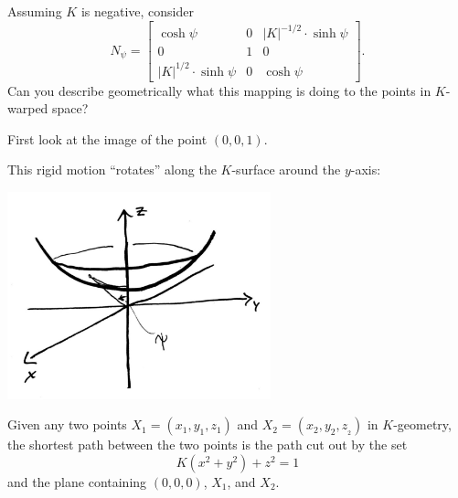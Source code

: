 \documentclass[newpage,hints,handout]{ximera}
\begin{document}
\begin{problem}
  Assuming $K$ is negative, consider
  \[
  N_\psi=
  \begin{bmatrix}
    \cosh\psi & 0 & |K|^{-1/2}\cdot\sinh\psi\\
    0 & 1 & 0\\
    |K|^{1/2}\cdot\sinh\psi & 0 & \cosh\psi
  \end{bmatrix}.
  \]
  Can you describe geometrically what this mapping is doing to the
  points in $K$-warped space?
  \begin{hint}
    First look at the image of the point $(0,0,1)$.
  \end{hint}
  \begin{freeResponse}
    This rigid motion ``rotates'' along the $K$-surface around the $y$-axis:
    \begin{image}
      \includegraphics[width=3in]{hyperRigidMotion.jpg}
    \end{image}
  \end{freeResponse}
\end{problem}


\begin{theorem}
Given any two points $X_{1}=\left(x_{1},y_{1},z_{1}\right) $ and
$X_{2}=\left(x_{2},y_{2},z_{_{2}}\right) $ in $K$-geometry, the
shortest path between the two points is the path cut out by the set
\[
K\left(  x^{2}+y^{2}\right)  +z^{2}=1
\]
and the plane containing $(0,0,0)$, $X_{1}$, and $X_{2}$.
\end{theorem}
\end{document}
